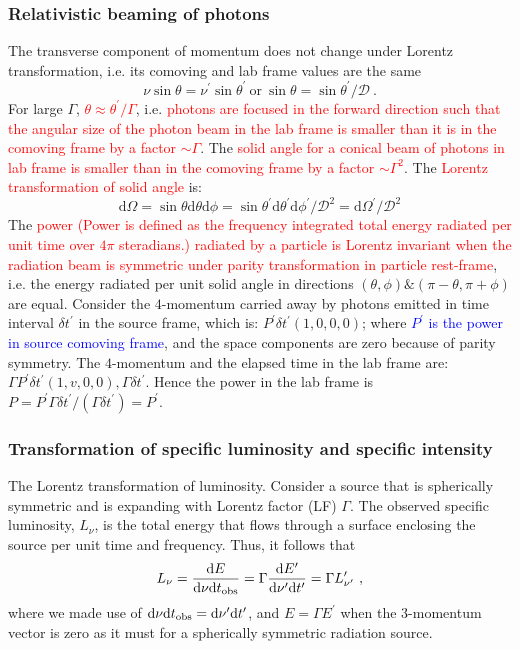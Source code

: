 \documentclass[12pt,a4paper]{article}
\newcommand{\dif}{\mathrm{d}}
\begin{document}
\subsubsection{Relativistic beaming of photons}
The transverse component of momentum does not change under Lorentz transformation, i.e. its comoving and lab frame values are the same
\begin{equation}
\nu \sin \theta = \nu^\prime \sin \theta^\prime ~\text{or}~ \sin \theta = \sin \theta^\prime /\mathscr D ~.
\end{equation}
For large $\Gamma$,  \textcolor{red}{$\theta \approx \theta^\prime /\Gamma$}, i.e. \textcolor{red}{photons are focused in the forward direction such that the angular size of the photon beam in the lab frame is smaller than it is in the comoving frame by a factor $\sim \Gamma$}. The  \textcolor{red}{solid angle for a conical beam of photons in lab frame is smaller than in the comoving frame by a factor $\sim \Gamma^2$}. The \textcolor{red}{Lorentz transformation of solid angle} is:
\begin{equation}
\dif \Omega = \sin \theta \dif \theta \dif \phi = \sin \theta^\prime \dif \theta^\prime \dif \phi^\prime /\mathscr D^2 = \dif \Omega^\prime /\mathscr D^2
\label{equ:solid_ang}
\end{equation}
The  \textcolor{red}{power (Power is defined as the frequency integrated total energy radiated per unit time over $4\pi$ steradians.) radiated by a particle is Lorentz invariant when the radiation beam is symmetric under parity transformation in particle rest-frame}, i.e. the energy radiated per unit solid angle in directions $(\theta, \phi) \& (\pi -\theta, \pi+\phi)$ are equal. Consider the $4$-momentum carried away by photons emitted in time interval $\delta t^\prime$ in the source frame, which is: $P^\prime \delta t^\prime(1,0,0,0)$; where  \textcolor{blue}{$P^\prime$ is the power in source comoving frame}, and the space components are zero because of parity symmetry. The $4$-momentum and the elapsed time in the lab frame are: $\Gamma P^\prime \delta t^\prime(1, v, 0, 0), \Gamma \delta t^\prime$. Hence the power in the lab frame is $P = P^\prime \Gamma  \delta t^\prime/(\Gamma  \delta t^\prime) = P^\prime$.

\subsubsection{Transformation of specific luminosity and specific intensity}
The Lorentz transformation of luminosity. Consider a source that is spherically symmetric and is expanding with Lorentz factor (LF) $\Gamma$. The observed specific luminosity, $L_\nu$, is the total energy that flows through a surface enclosing the source per unit time and frequency. Thus, it follows that
\begin{equation}
L_\nu = \dfrac{\dif E}{\dif \nu \dif t_{\rm obs}} = \Gamma \dfrac{\dif E^\prime}{\dif \nu^\prime \dif t^\prime} = \Gamma  L^\prime_{\nu^\prime} ~,
\end{equation}
where we made use of $\dif \nu \dif t_{\rm obs} = \dif \nu^\prime \dif t^\prime$, and $E = \Gamma E^\prime$ when the $3$-momentum vector is zero as it must for a spherically symmetric radiation source.
\end{document}
